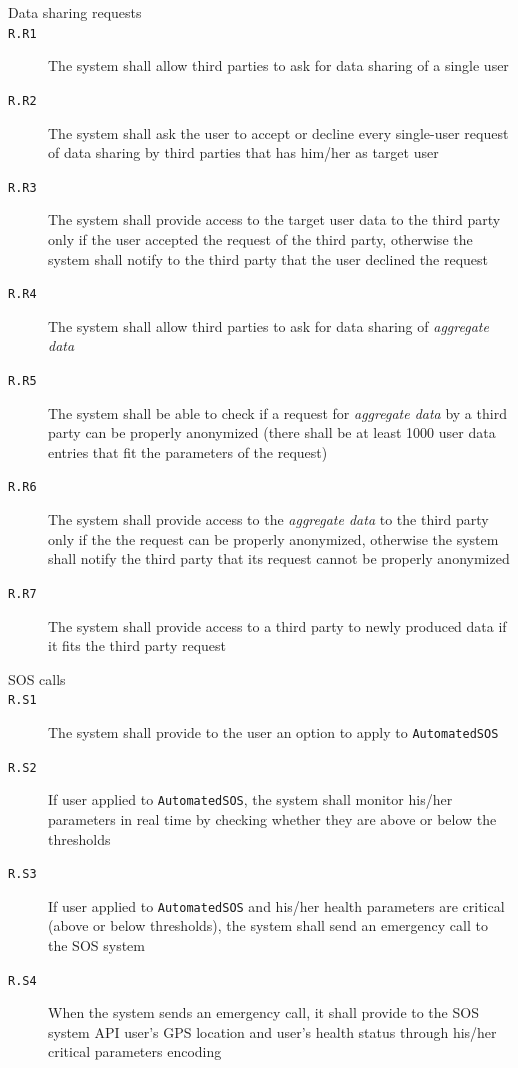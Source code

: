 \begin{description}
      \item[Data sharing requests]
      \item[\texttt{R.R1}] The system shall allow third parties to ask for data sharing of a single user
      \item[\texttt{R.R2}] The system shall ask the user to accept or decline every single-user request of data sharing by third parties that has him/her as target user
      \item[\texttt{R.R3}] The system shall provide access to the target user data to the third party only if the user accepted the request of the third party, otherwise the system shall notify to the third party that the user declined the request
      \item[\texttt{R.R4}] The system shall allow third parties to ask for data sharing of \textit{aggregate data}
      \item[\texttt{R.R5}] The system shall be able to check if a request for \textit{aggregate data} by a third party can be properly anonymized (there shall be at least 1000 user data entries that fit the parameters of the request)
      \item[\texttt{R.R6}] The system shall provide access to the \textit{aggregate data} to the third party only if the the request can be properly anonymized, otherwise the system shall notify the third party that its request cannot be properly anonymized
      \item[\texttt{R.R7}] The system shall provide access to a third party to newly produced data if it fits the third party request

      \item[SOS calls]
      \item[\texttt{R.S1}] The system shall provide to the user an option to apply to \texttt{AutomatedSOS}
      \item[\texttt{R.S2}] If user applied to \texttt{AutomatedSOS}, the system shall monitor his/her parameters in real time by checking whether they are above or below the thresholds
      \item[\texttt{R.S3}] If user applied to \texttt{AutomatedSOS} and his/her health parameters are critical (above or below thresholds), the system shall send an emergency call to the SOS system
      \item[\texttt{R.S4}] When the system sends an emergency call, it shall provide to the SOS system API user's GPS location and user's health status through his/her critical parameters encoding

    \end{description}


